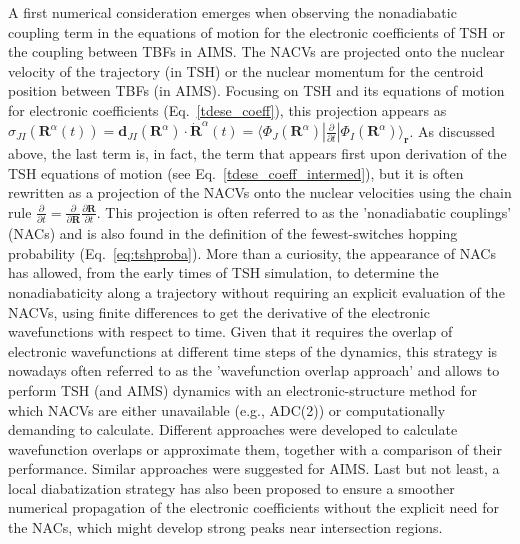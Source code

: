 \documentclass[9pt,bestpractices]{livecoms}
\newcommand{\bra}[1]{\langle #1|}
\newcommand{\ket}[1]{|#1\rangle}
\newcommand{\bs}{\mathbf}
\begin{document}
A first numerical consideration emerges when observing the nonadiabatic coupling term in the equations of motion for the electronic coefficients of TSH or the coupling between TBFs in AIMS. The NACVs are projected onto the nuclear velocity of the trajectory (in TSH) or the nuclear momentum for the centroid position between TBFs (in AIMS). Focusing on TSH and its equations of motion for electronic coefficients (Eq.~\eqref{tdese_coeff}), this projection appears as $\sigma_{JI}(\bs R^{\alpha}(t))=\bs d_{JI}\left(\bs R^{\alpha}\right)\cdot \dot{\bs R}^{\alpha}(t) = \bra{\Phi_J(\bs R^{\alpha})}\frac{\partial}{\partial t}\ket{\Phi_I(\bs R^{\alpha})}_{\mathbf{r}}$.\cite{hammes94} As discussed above, the last term is, in fact, the term that appears first upon derivation of the TSH equations of motion (see Eq.~\eqref{tdese_coeff_intermed}), but it is often rewritten as a projection of the NACVs onto the nuclear velocities using the chain rule $\frac{\partial}{\partial t} = \frac{\partial}{\partial \bs R}\frac{\partial \bs R}{\partial t}$. This projection is often referred to as the 'nonadiabatic couplings' (NACs) and is also found in the definition of the fewest-switches hopping probability (Eq.~\eqref{eq:tshproba}). More than a curiosity, the appearance of NACs has allowed, from the early times of TSH simulation, to determine the nonadiabaticity along a trajectory without requiring an explicit evaluation of the NACVs, using finite differences to get the derivative of the electronic wavefunctions with respect to time.\cite{hammes94} Given that it requires the overlap of electronic wavefunctions at different time steps of the dynamics, this strategy is nowadays often referred to as the 'wavefunction overlap approach' and allows to perform TSH (and AIMS) dynamics with an electronic-structure method for which NACVs are either unavailable (e.g., ADC(2)) or computationally demanding to calculate. Different approaches were developed to calculate wavefunction overlaps\cite{tapavicza07,mitric2008nonadiabatic,PITTNER2009147,meek2014tdc,Ryabinkin2015,plasser2016,Xiaorui2023} or approximate them,\cite{baeck-an2017} together with a comparison of their performance.\cite{merritt2023} Similar approaches were suggested for AIMS.\cite{levine2008implementation,tao2009ab} Last but not least, a local diabatization strategy has also been proposed to ensure a smoother numerical propagation of the electronic coefficients without the explicit need for the NACs, which might develop strong peaks near intersection regions.\cite{plasser2012} 
\end{document}
